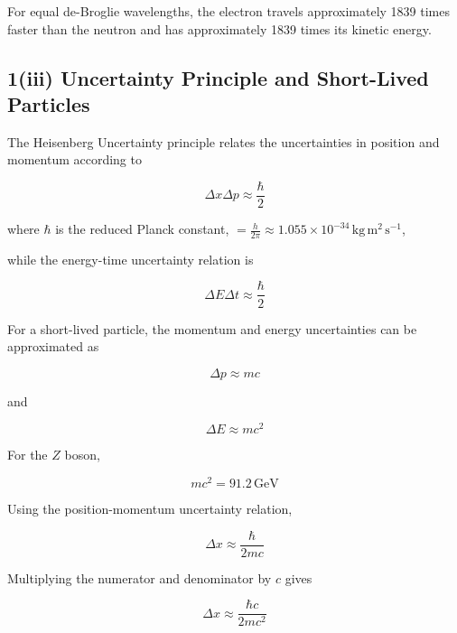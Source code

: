 \documentclass{article}
\begin{document}
For equal de-Broglie wavelengths, the electron travels
approximately 1839 times faster than the neutron and has
approximately 1839 times its kinetic energy.


\subsection*{1(iii) Uncertainty Principle and Short-Lived Particles}

The Heisenberg Uncertainty principle relates the uncertainties in
position and momentum according to

\begin{equation*}
\Delta x\Delta p\approx\frac{\hbar}{2}
\end{equation*}

where $\hbar$ is the reduced Planck constant, $= \frac{h}{2\pi} \approx 1.055 \times 10^{-34} \, \mathrm{kg\,m^{2}\,s^{-1}}$,

\vspace{1\baselineskip}

while the energy-time uncertainty relation is

\begin{equation*}
\Delta E\Delta t \approx \frac{\hbar}{2}
\end{equation*}

For a short-lived particle, the momentum and energy uncertainties
can be approximated as

\begin{equation*}
\Delta p \approx mc
\end{equation*}

and

\begin{equation*}
\Delta E \approx mc^2
\end{equation*}

For the $Z$ boson,

\begin{equation*}
mc^2=91.2\,\mathrm{GeV}
\end{equation*}

Using the position-momentum uncertainty relation,

\begin{equation*}
\Delta x \approx \frac{\hbar}{2mc}
\end{equation*}

Multiplying the numerator and denominator by $c$ gives

\begin{equation*}
\Delta x \approx \frac{\hbar c}{2mc^2}
\end{equation*}
\end{document}
